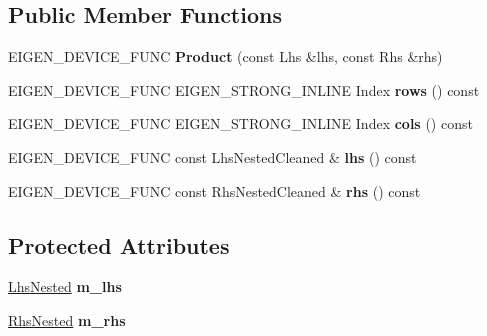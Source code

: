 \subsection*{Public Member Functions}
\begin{DoxyCompactItemize}
\item 
\mbox{\label{class_eigen_1_1_product_afc1b220468601bf9fff9e4e436e7ca1f}} 
E\+I\+G\+E\+N\+\_\+\+D\+E\+V\+I\+C\+E\+\_\+\+F\+U\+NC {\bfseries Product} (const Lhs \&lhs, const Rhs \&rhs)
\item 
\mbox{\label{class_eigen_1_1_product_a2790a0f0529280ac6b0d162290242162}} 
E\+I\+G\+E\+N\+\_\+\+D\+E\+V\+I\+C\+E\+\_\+\+F\+U\+NC E\+I\+G\+E\+N\+\_\+\+S\+T\+R\+O\+N\+G\+\_\+\+I\+N\+L\+I\+NE Index {\bfseries rows} () const
\item 
\mbox{\label{class_eigen_1_1_product_ae05cc4ade4160940af6b9031c33a14df}} 
E\+I\+G\+E\+N\+\_\+\+D\+E\+V\+I\+C\+E\+\_\+\+F\+U\+NC E\+I\+G\+E\+N\+\_\+\+S\+T\+R\+O\+N\+G\+\_\+\+I\+N\+L\+I\+NE Index {\bfseries cols} () const
\item 
\mbox{\label{class_eigen_1_1_product_a1b43ae06c2a56d9e51880240fa75a7fb}} 
E\+I\+G\+E\+N\+\_\+\+D\+E\+V\+I\+C\+E\+\_\+\+F\+U\+NC const Lhs\+Nested\+Cleaned \& {\bfseries lhs} () const
\item 
\mbox{\label{class_eigen_1_1_product_ac22144fef8af19dc90c87d15af7ad7e1}} 
E\+I\+G\+E\+N\+\_\+\+D\+E\+V\+I\+C\+E\+\_\+\+F\+U\+NC const Rhs\+Nested\+Cleaned \& {\bfseries rhs} () const
\end{DoxyCompactItemize}
\subsection*{Protected Attributes}
\begin{DoxyCompactItemize}
\item 
\mbox{\label{class_eigen_1_1_product_aee528fc769eb6f7dc7fc4b50eac26086}} 
\mbox{\hyperlink{struct_eigen_1_1internal_1_1true__type}{Lhs\+Nested}} {\bfseries m\+\_\+lhs}
\item 
\mbox{\label{class_eigen_1_1_product_a8720f5e73e0436b6ddd28f4a7f20a334}} 
\mbox{\hyperlink{struct_eigen_1_1internal_1_1true__type}{Rhs\+Nested}} {\bfseries m\+\_\+rhs}
\end{DoxyCompactItemize}


